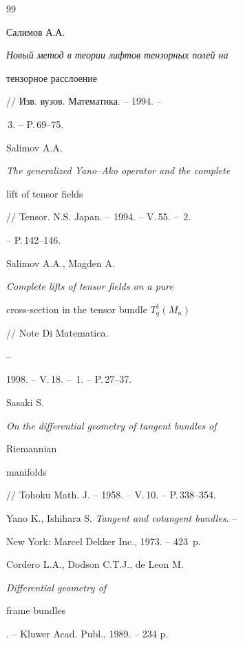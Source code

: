 \begin{thebibliography}{99}







Салимов А.А. {\em Новый метод в теории лифтов тензорных полей на


тензорное расслоение} // Изв. вузов. Математика. -- 1994. --


\No\,3. -- P.\,69--75.







Salimov A.A. {\em The generalized Yano--Ako operator and the complete


lift  of tensor fields} // Tensor. N.S. Japan. -- 1994. -- V.\,55. -- \No\,2.


-- P.\,142--146.







Salimov A.A., Magden A. {\em Complete lifts of tensor fields on a pure


cross-section in the tensor bundle $T^1_q(M_n)$} // Note Di Matematica.


--


1998. -- V.\,18. -- \No\,1. -- P.\,27--37.







Sasaki S. {\em On the differential geometry of tangent bundles of


Riemannian


manifolds} // Tohoku Math. J. -- 1958. -- V.\,10. -- P.\,338--354.







Yano K., Ishihara S. {\em Tangent and cotangent bundles}. --


New York: Marcel Dekker Inc., 1973. -- 423~p.







Cordero L.A., Dodson C.T.J., de Leon M. {\em Differential geometry of


frame bundles}. -- Kluwer Acad. Publ., 1989. -- 234 p.






\end{thebibliography}

